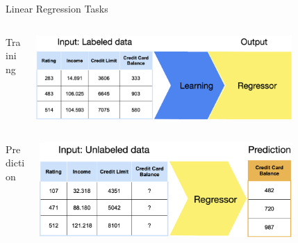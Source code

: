 \documentclass[11pt,compress,t,notes=noshow, xcolor=table]{beamer}
\begin{document}
\begin{vbframe}{Linear Regression Tasks}
\begin{columns}  
\begin{column}{0.1\textwidth} 
\begin{center}
Training
\end{center}
\end{column}
\begin{column}{0.9\textwidth} 
\begin{center}
  \includegraphics[width = 0.8\textwidth]{figure_man/nutshell-regression-learning-task.png}
\end{center}
\end{column}
\end{columns}
\begin{columns}
\begin{column}{0.1\textwidth} 
\begin{center}
Prediction
\end{center}
\end{column}
\begin{column}{0.9\textwidth} 
\begin{center}
  \includegraphics[width = 0.8\textwidth]{figure_man/nutshell-regression-prediction-task.png} 
\end{center}
\end{column}
\end{columns}

\end{vbframe}
\end{document}
